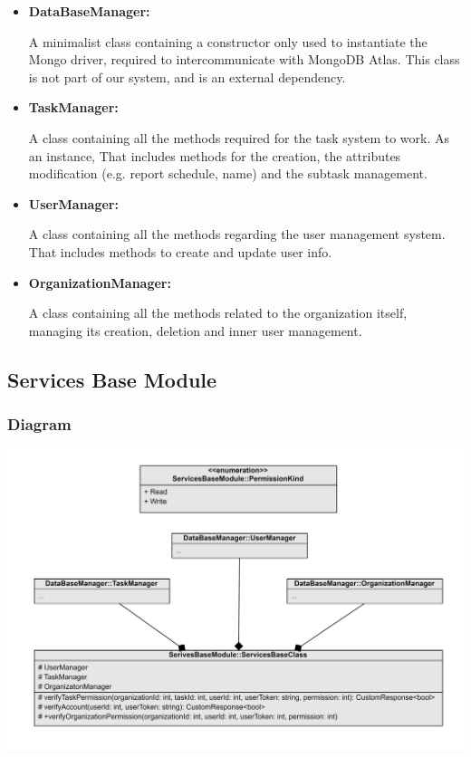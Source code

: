 \documentclass{article}
\begin{document}
\begin{itemize}
  \item \textbf{DataBaseManager: }
  
  A minimalist class containing a constructor only used to instantiate the Mongo driver, required to intercommunicate with MongoDB Atlas.
  This class is not part of our system, and is an external dependency.

  \item \textbf{TaskManager: }
  
  A class containing all the methods required for the task system to work. As an instance, That includes methods for the creation, the attributes modification (e.g. report schedule, name) and the subtask management.

  \item \textbf{UserManager: }
  
  A class containing all the methods regarding the user management system. That includes methods to create and update user info.

  \item \textbf{OrganizationManager: }
  
  A class containing all the methods related to the organization itself, managing its creation, deletion and inner user management.

\end{itemize}


\subsection{Services Base Module}

\subsubsection{Diagram}

\includegraphics[width=\textwidth,height=\textheight,keepaspectratio]{images/class_diagram/services_base_.jpg}
\end{document}
